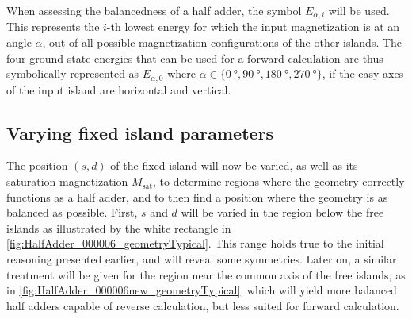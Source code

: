 \documentclass[11pt,a4paper,english,twoside]{article}
\begin{document}
When assessing the balancedness of a half adder, the symbol $E_{\alpha,i}$ will be used. This represents the $i$-th lowest energy for which the input magnetization is at an angle $\alpha$, out of all possible magnetization configurations of the other islands. The four ground state energies that can be used for a forward calculation are thus symbolically represented as $E_{\alpha,0}$ where $\alpha \in \{ \SI{0}{\degree}, \SI{90}{\degree}, \SI{180}{\degree}, \SI{270}{\degree} \}$, if the easy axes of the input island are horizontal and vertical.

\subsection{Varying fixed island parameters}
The position $(s,d)$ of the fixed island will now be varied, as well as its saturation magnetization $M_\mathrm{sat}$, to determine regions where the geometry correctly functions as a half adder, and to then find a position where the geometry is as balanced as possible. First, $s$ and $d$ will be varied in the region below the free islands as illustrated by the white rectangle in \cref{fig:HalfAdder_000006_geometryTypical}. This range holds true to the initial reasoning presented earlier, and will reveal some symmetries. Later on, a similar treatment will be given for the region near the common axis of the free islands, as in \cref{fig:HalfAdder_000006new_geometryTypical}, which will yield more balanced half adders capable of reverse calculation, but less suited for forward calculation.
\end{document}
